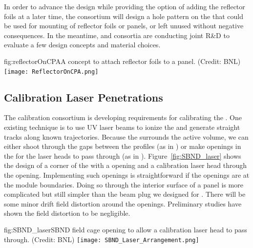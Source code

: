 In order to advance the  design while providing the option of adding the reflector foils at a later time, the  consortium will design %
a hole pattern 
on the %
 that could be used for mounting of reflector foils or panels, or left unused without negative consequences. In the meantime,  and  consortia are conducting joint R\&D to evaluate a few design concepts and material choices. 


\begin{dunefigure}{fig:reflectorOnCPA}{A concept to attach reflector foils to a  panel. (Credit: BNL)}
\texttt{[image: ReflectorOnCPA.png]}
\end{dunefigure}

\subsection{Calibration Laser Penetrations}
\label{sec:fdsp-hv-app-alt-cal}

The calibration consortium is developing requirements for calibrating the \efield.  One existing technique is to use UV laser beams to ionize the  and generate straight tracks along known trajectories.  Because the  surrounds the  active volume, we can either shoot through the gaps between the  profiles (as in ) or make openings in the  for the laser heads to pass through (as in ). Figure~\ref{fig:SBND_laser}  shows the design of a corner of the   with a   opening and a calibration laser head through the opening.  Implementing such openings is straightforward if the openings are at the   module boundaries.  Doing so through the interior surface of a  panel is more complicated but still simpler than the beam plug we designed for .  There will be some minor drift field distortion around the openings.  Preliminary  studies have shown the field distortion to be negligible. 

\begin{dunefigure}{fig:SBND_laser}{SBND field cage opening to allow a calibration laser head to pass through. (Credit: BNL)}
\texttt{[image: SBND\_Laser\_Arrangement.png]}
\end{dunefigure}


